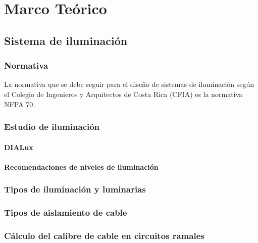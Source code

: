   \chapter{Marco Teórico} 
\label{C:antecedentes}


\section{Sistema de iluminación}

\subsection{Normativa}

La normativa que se debe seguir para el diseño de sistemas de iluminación según el Colegio de Ingenieros y Arquitectos de Costa Rica (CFIA) es la normativa NFPA 70. \cite{CIEMI}




\subsection{Estudio de iluminación}

\subsubsection{DIALux}



\subsubsection{Recomendaciones de niveles de iluminación}






\subsection{Tipos de iluminación y luminarias}




\subsection{Tipos de aislamiento de cable}




\subsection{Cálculo del calibre de cable en circuitos ramales}




